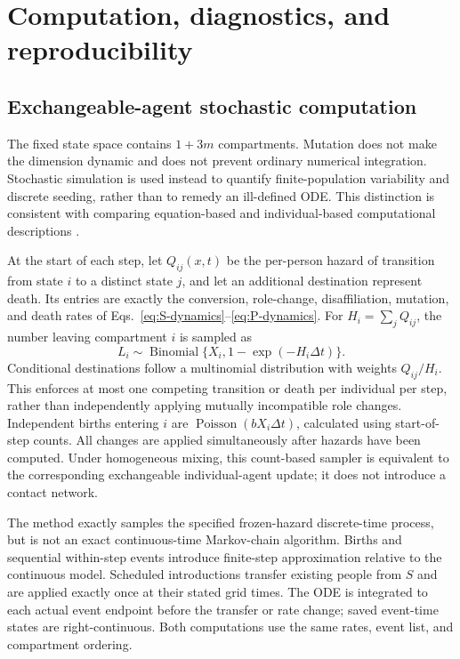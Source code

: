 \FloatBarrier
\appendix
\section{Computation, diagnostics, and reproducibility}
\label{app:computation}
\subsection{Exchangeable-agent stochastic computation}
The fixed state space contains $1+3m$ compartments. Mutation does not make the dimension dynamic and does not prevent ordinary numerical integration. Stochastic simulation is used instead to quantify finite-population variability and discrete seeding, rather than to remedy an ill-defined ODE. This distinction is consistent with comparing equation-based and individual-based computational descriptions \cite{macal2010agent,schimit2023multi,scheidegger2018comparison,hunter2020hybrid,lazebnik2025comparing}.

At the start of each step, let $Q_{ij}(x,t)$ be the per-person hazard of transition from state $i$ to a distinct state $j$, and let an additional destination represent death. Its entries are exactly the conversion, role-change, disaffiliation, mutation, and death rates of Eqs.~\eqref{eq:S-dynamics}--\eqref{eq:P-dynamics}. For $H_i=\sum_jQ_{ij}$, the number leaving compartment $i$ is sampled as
\begin{equation}
L_i\sim\operatorname{Binomial}\{X_i,1-\exp(-H_i\Delta t)\}.
\end{equation}
Conditional destinations follow a multinomial distribution with weights $Q_{ij}/H_i$. This enforces at most one competing transition or death per individual per step, rather than independently applying mutually incompatible role changes. Independent births entering $i$ are $\operatorname{Poisson}(bX_i\Delta t)$, calculated using start-of-step counts. All changes are applied simultaneously after hazards have been computed. Under homogeneous mixing, this count-based sampler is equivalent to the corresponding exchangeable individual-agent update; it does not introduce a contact network.

The method exactly samples the specified frozen-hazard discrete-time process, but is not an exact continuous-time Markov-chain algorithm. Births and sequential within-step events introduce finite-step approximation relative to the continuous model. Scheduled introductions transfer existing people from $S$ and are applied exactly once at their stated grid times. The ODE is integrated to each actual event endpoint before the transfer or rate change; saved event-time states are right-continuous. Both computations use the same rates, event list, and compartment ordering.

